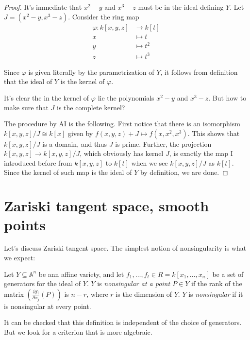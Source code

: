 \begin{proof}
It's immediate that $x^2-y$ and $x^3-z$ must be in 
the ideal defining $Y$. Let $J=(x^2-y,x^3-z)$. 
Consider the ring map
\begin{align*}
\varphi:k[x,y,z] &\longrightarrow k[t] \\
x &\longmapsto t\\
y &\longmapsto t^2\\
z &\longmapsto t^3
\end{align*}

\noindent
Since $\varphi$ is given literally by the parametrization of $Y$,
it follows from definition that the ideal of $Y$
is the kernel of $\varphi$.

It's clear the in the kernel of $\varphi$
lie the polynomials $x^2-y$ and $x^3-z$.
But how to make sure that $J$ is the complete kernel?

The procedure by AI is the following.
First notice that there is an isomorphism
$k[x,y,z]/J \cong k[x]$
given by $f(x,y,z)+J \mapsto f(x,x^2,x^3)$.
This shows that $k[x,y,z]/J$ is a domain, and thus $J$ is prime.
Further, the projection $k[x,y,z] \to k[x,y,z]/J$,
which obviously has kernel $J$,
is exactly the map I introduced before from
$k[x,y,z]$ to $k[t]$ when we see $k[x,y,z]/J$ as $k[t]$.
Since the kernel of such map is the ideal of $Y$ by definition,
we are done.
\end{proof}

\section{Zariski tangent space, smooth points}
\label{section-multiplicities-smooth-points-bezout}

\noindent
Let's discuss Zariski tangent space.
The simplest notion of nonsingularity is what we expect:

\begin{definition}
\label{definition-nonsingular-affine}
Let $Y \subseteq \mathbb{A}^n$ be ann affine variety,
and let $f_1,…,f_t \in R=k[x_1,…,x_n]$ be a set of generators
for the ideal of $Y$.
$Y$ is {\it nonsingular at a point $P \in Y$}
if the rank of the matrix
$\left(\frac{\partial f_i}{\partial x_j}(P)\right)$
is $n-r$, where $r$ is the dimension of $Y$.
$Y$ is {\it nonsingular} if it is nonsingular at every point.
\end{definition}

\noindent
It can be checked that this definition is independent
of the choice of generators. But we look for a
criterion that is more algebraic.

